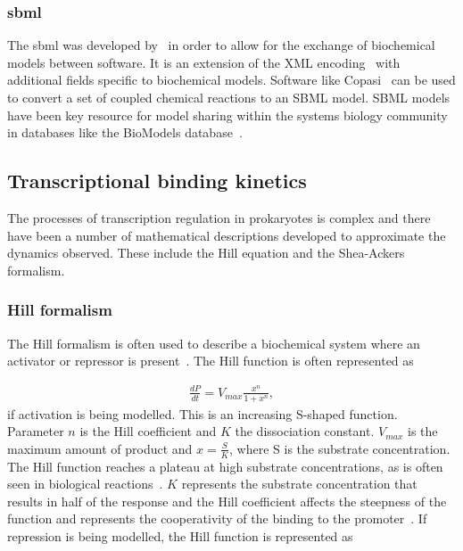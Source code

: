 \subsubsection{\acrfull{sbml}}

The \acrfull{sbml} was developed by~\textcite{Hucka:2003wg} in order to allow for the exchange of biochemical models between software. It is an extension of the XML encoding~\autocite{DuCharme:1999} with additional fields specific to biochemical models. Software like Copasi~\autocite{Hoops:2006gy} can be used to convert a set of coupled chemical reactions to an SBML model. SBML models have been key resource for model sharing within the systems biology community~\autocite{Wilkinson:2006td} in databases like the BioModels database~\autocite{LeNovere:2006ep}. 

\subsection{Transcriptional binding kinetics}

The processes of transcription regulation in prokaryotes is complex and there have been a number of mathematical descriptions developed to approximate the dynamics observed. These include the Hill equation and the Shea-Ackers formalism. 

\subsubsection{Hill formalism}
\label{sec:hill}
The Hill formalism is often used to describe a biochemical system where an activator or repressor is present~\autocite{Hill:1910vo}. The Hill function is often represented as

\begin{align*}
	\frac{dP}{dt} = V_{max}\frac{x^n}{1 + x^n},
\end{align*}
\noindent if activation is being modelled. This is an increasing S-shaped function. Parameter $n$ is the Hill coefficient and $K$ the dissociation constant. $V_{max}$ is the maximum amount of product and $x = \frac{S}{K}$, where S is the substrate concentration. The Hill function reaches a plateau at high substrate concentrations, as is often seen in biological reactions~\autocite{Alon:2007}. $K$ represents the substrate concentration that results in half of the response and the Hill coefficient affects the steepness of the function and represents the cooperativity of the binding to the promoter~\autocite{Alon:2007}. If repression is being modelled, the Hill function is represented as

